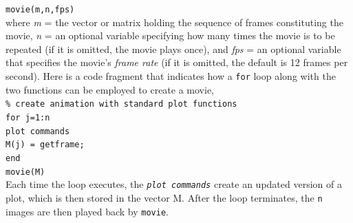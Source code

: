 \documentclass[../main.tex]{subfiles}
\begin{document}
\texttt{movie(m,n,fps)}\\

\noindent where \emph{m} = the vector or matrix holding the sequence of frames constituting the movie,
\emph{n} = an optional variable specifying how many times the movie is to be repeated (if it is
omitted, the movie plays once), and \emph{fps} = an optional variable that specifies the
movie's \emph{frame rate} (if it is omitted, the default is 12 frames per second). Here is a code
fragment that indicates how a \texttt{for} loop along with the two functions can be employed
to create a movie,\\

\texttt{\% create animation with standard plot functions\\
\indent for j=1:n\\
\indent\hspace{2mm} plot commands\\
\indent\hspace{2mm} M(j) = getframe;\\
\indent end\\
\indent movie(M)}\\

Each time the loop executes, the \texttt{\emph{plot commands}} create an updated version of a plot,
which is then stored in the vector M. After the loop terminates, the \texttt{n} images are then played
back by \texttt{movie}.\\
\end{document}
